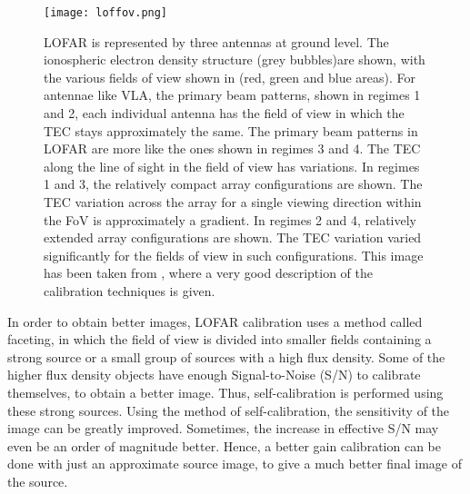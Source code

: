 \documentclass[../main/thesis_msc.tex]{subfiles}
\begin{document}
\begin{figure}[h]
\centering
\texttt{[image: loffov.png]}
\caption{LOFAR is represented by three antennas at ground level. The ionospheric electron density structure (grey bubbles)are shown, with the various fields of view shown in (red, green and blue areas). For antennae like VLA, the primary beam patterns, shown in regimes 1 and 2, each individual antenna has the field of view in which the TEC stays approximately the same. The primary beam patterns in LOFAR are more like the ones shown in regimes 3 and 4. The TEC along the line of sight in the field of view has variations. In regimes 1 and 3, the relatively compact array configurations are shown. The TEC variation across the array for a single viewing direction within the FoV is approximately a gradient. In regimes 2 and 4, relatively extended array configurations are shown. The TEC variation varied significantly for the fields of view in such configurations. This image has been taken from \citet{2009A&A...501.1185I}, where a very good description of the calibration techniques is given.}
\label{fovl}
\end{figure}

In order to obtain better images, LOFAR calibration uses a method called faceting, in which the field of view is divided into smaller fields containing a strong source or a small group of sources with a high flux density. Some of the higher flux density objects have enough Signal-to-Noise (S/N) to calibrate themselves, to obtain a better image. Thus, self-calibration is performed using these strong sources. Using the method of self-calibration, the sensitivity of the image can be greatly improved. Sometimes, the increase in effective S/N may even be an order of magnitude better. Hence, a better gain calibration can be done with just an approximate source image, to give a much better final image of the source. 
\end{document}
